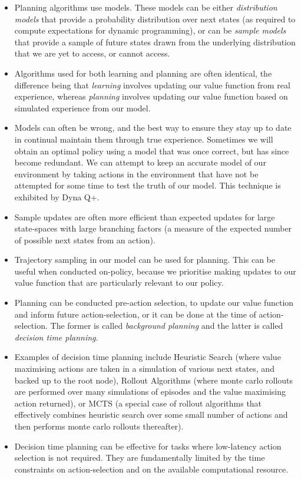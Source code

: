 \begin{itemize}
	\item Planning algorithms use models. These models can be either \textit{distribution models} that provide a probability distribution over next states (as required to compute expectations for dynamic programming), or can be \textit{sample models} that provide a sample of future states drawn from the underlying distribution that we are yet to access, or cannot access.
	\item Algorithms used for both learning and planning are often identical, the difference being that \textit{learning} involves updating our value function from real experience, whereas \textit{planning} involves updating our value function based on simulated experience from our model.
	\item Models can often be wrong, and the best way to ensure they stay up to date in continual maintain them through true experience. Sometimes we will obtain an optimal policy using a model that was once correct, but has since become redundant. We can attempt to keep an accurate model of our environment by taking actions in the environment that have not be attempted for some time to test the truth of our model. This technique is exhibited by Dyna Q+.
	\item Sample updates are often more efficient than expected updates for large state-spaces with large branching factors (a measure of the expected number of possible next states from an action).
	\item Trajectory sampling in our model can be used for planning. This can be useful when conducted on-policy, because we prioritise making updates to our value function that are particularly relevant to our policy.
	\item Planning can be conducted pre-action selection, to update our value function and inform future action-selection, or it can be done at the time of action-selection. The former is called \textit{background planning} and the latter is called \textit{decision time planning}.
	\item Examples of decision time planning include Heuristic Search (where value maximising actions are taken in a simulation of various next states, and backed up to the root node), Rollout Algorithms (where monte carlo rollouts are performed over many simulations of episodes and the value maximising action returned), or MCTS (a special case of rollout algorithms that effectively combines heuristic search over some small number of actions and then performs monte carlo rollouts thereafter).
	\item Decision time planning can be effective for tasks where low-latency action selection is not required. They are fundamentally limited by the time constraints on action-selection and on the available computational resource.
\end{itemize}

